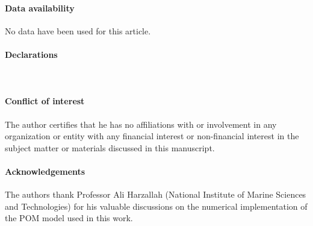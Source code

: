 \documentclass[a4paper,12pt,reqno,natbib]{amsart}
\begin{document}
\paragraph{\bf{Data availability}} No data have been used for this article.\\




\paragraph{\bf{ Declarations}}\, \\

\paragraph{\bf{Conflict of interest}} The author certifies that he has no affiliations with or involvement in any organization or
entity with any financial interest or non-financial interest in the subject matter or materials discussed in this
manuscript.\\


\paragraph{\bf{Acknowledgements}} The authors thank Professor Ali Harzallah (National Institute of Marine Sciences and Technologies) for his valuable discussions on the numerical implementation of the POM model used in this work.




\end{document}
